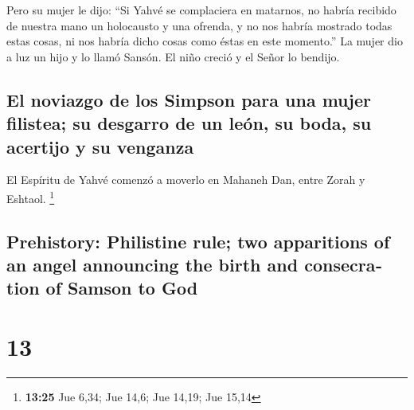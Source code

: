 \begin{paracol}{2}
 Pero su mujer le dijo: ``Si Yahvé se complaciera en
matarnos, no habría recibido de nuestra mano un holocausto y una
ofrenda, y no nos habría mostrado todas estas cosas, ni nos habría dicho
cosas como éstas en este momento.''  La mujer dio a luz
un hijo y lo llamó Sansón. El niño creció y el Señor lo bendijo.

\hypertarget{el-noviazgo-de-los-simpson-para-una-mujer-filistea-su-desgarro-de-un-leuxf3n-su-boda-su-acertijo-y-su-venganza}{%
\subsection{El noviazgo de los Simpson para una mujer filistea; su
desgarro de un león, su boda, su acertijo y su
venganza}\label{el-noviazgo-de-los-simpson-para-una-mujer-filistea-su-desgarro-de-un-leuxf3n-su-boda-su-acertijo-y-su-venganza}}

 El Espíritu de Yahvé comenzó a moverlo en Mahaneh Dan,
entre Zorah y Eshtaol. \footnote{\textbf{13:25} Jue 6,34; Jue 14,6; Jue
  14,19; Jue 15,14}

\switchcolumn
\begin{otherlanguage}{english}

\hypertarget{prehistory-philistine-rule-two-apparitions-of-an-angel-announcing-the-birth-and-consecration-of-samson-to-god}{%
\subsection{Prehistory: Philistine rule; two apparitions of an angel
announcing the birth and consecration of Samson to
God}\label{prehistory-philistine-rule-two-apparitions-of-an-angel-announcing-the-birth-and-consecration-of-samson-to-god}}

\hypertarget{section-25}{%
\section{13}\label{section-25}}


\end{otherlanguage}
\end{paracol}

